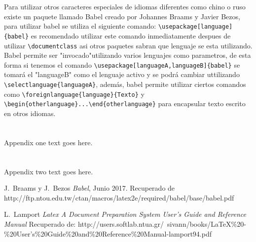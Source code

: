 \documentclass[10pt,journal,compsoc]{IEEEtran}
\begin{document}
Para utilizar otros caracteres especiales de idiomas diferentes como chino o ruso existe un paquete llamado Babel creado por Johannes Braams y Javier Bezos, para utilizar babel se utiliza el siguiente comando: \verb|\usepackage[language]{babel}| es recomendado utilizar este comando inmediatamente despues de utilizar \verb|\documentclass| asi otros paquetes sabran que lenguaje se esta utilizando. Babel permite ser "invocado"utilizando varios lenguajes como parametros, de esta forma si tenemos el comando \verb|\usepackage[languageA,languageB]{babel}| se tomará el "languageB" como el lenguaje activo y se podrá cambiar uttilizando \verb|\selectlanguage{languageA}|, además, babel permite utilizar ciertos comandos como \verb|\foreignlanguage{language}{Texto}| y \verb|\begin{otherlanguage}...\end{otherlanguage}| para encapsular texto escrito en otros idiomas.

\appendices
\section{}
Appendix one text goes here.

\section{}
Appendix two text goes here.

\begin{thebibliography}{2}
	
	J.~Braams y J.~Bezos \emph{Babel}, Junio 2017. Recuperado de http://ftp.ntou.edu.tw/ctan/macros/latex2e/required/babel/base/babel.pdf  
	
	L.~Lamport \emph{Latex A Document Preparation System User's Guide and Reference Manual} Recuperado de:
	http://users.softlab.ntua.gr/~sivann/books/LaTeX\%20-\%20User's\%20Guide\%20and\%20Reference\%20Manual-lamport94.pdf
	
	
	
\end{thebibliography}
\end{document}
